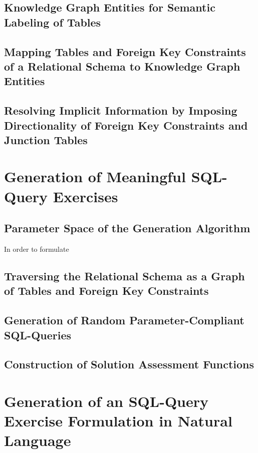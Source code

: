 \subsection{Knowledge Graph Entities for Semantic Labeling of Tables}
\label{sec:des:entities}

\subsection{Mapping Tables and Foreign Key Constraints of a Relational Schema to Knowledge Graph Entities}
\label{sec:des:mapping}

\subsection{Resolving Implicit Information by Imposing Directionality of Foreign Key Constraints and Junction Tables}
\label{sec:des:resolving}



\section{Generation of Meaningful SQL-Query Exercises}
\label{sec:des:generation}

\subsection{Parameter Space of the Generation Algorithm}
\label{sec:des:parameters}
In order to formulate


\subsection{Traversing the Relational Schema as a Graph of Tables and Foreign Key Constraints}
\label{sec:des:traversal}

\subsection{Generation of Random Parameter-Compliant SQL-Queries}
\label{sec:des:algorithm}

\subsection{Construction of Solution Assessment Functions}
\label{sec:des:assessment}


\section{Generation of an SQL-Query Exercise Formulation in Natural Language}
\label{sec:des:formulation}

